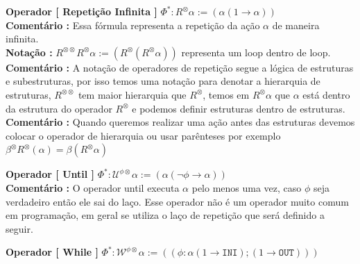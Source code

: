 \documentclass[10pt,a4paper]{report}
\begin{document}
\hspace{\baselineskip}

\textbf{Operador [ Repetição Infinita ]} $ \Phi^* : R^{ \otimes} \alpha := ( \alpha ( 1 \rightarrow \alpha) ) $\\

\textbf{Comentário :} Essa fórmula representa a repetição da ação $\alpha$ de maneira infinita.\\

\textbf{Notação :} $ R^{\otimes \otimes} R^{\otimes} \alpha := ( R^{\otimes} ( R^{\otimes} \alpha ) ) $ representa um loop dentro de loop.\\

\textbf{Comentário :} A notação de operadores de repetição segue a lógica de estruturas e subestruturas, por isso temos uma notação para denotar a hierarquia de estruturas, $R^{\otimes \otimes}$ tem maior hierarquia que $ R^{\otimes} $, temos em $R^{\otimes} \alpha$ que $\alpha$ está dentro da estrutura do operador $R^{\otimes}$ e podemos definir estruturas dentro de estruturas.\\

\textbf{Comentário :} Quando queremos realizar uma ação antes das estruturas devemos colocar o operador de hierarquia ou usar parênteses por exemplo $ \beta^{\otimes} R^{\otimes} (\alpha)  = \beta ( R^{\otimes} \alpha )  $

\hspace{\baselineskip}

\textbf{Operador [ Until ]} $ \Phi^* : \mathcal{U}^{ \phi \otimes } \alpha := ( \alpha ( \neg \phi \rightarrow \alpha ) ) $\\

\textbf{Comentário :} O operador until executa $\alpha$ pelo menos uma vez, caso $\phi$ seja verdadeiro então ele sai do laço. Esse operador não é um operador muito comum em programação, em geral se utiliza o laço de repetição que será definido a seguir.

\hspace{\baselineskip}

\textbf{Operador [ While ]} $ \Phi^* :  \mathcal{W}^{\phi \otimes} \alpha := ( ( \phi : \alpha (1 \rightarrow \texttt{INI}) ; (1 \rightarrow \texttt{OUT} ) ) ) $\\
\end{document}
